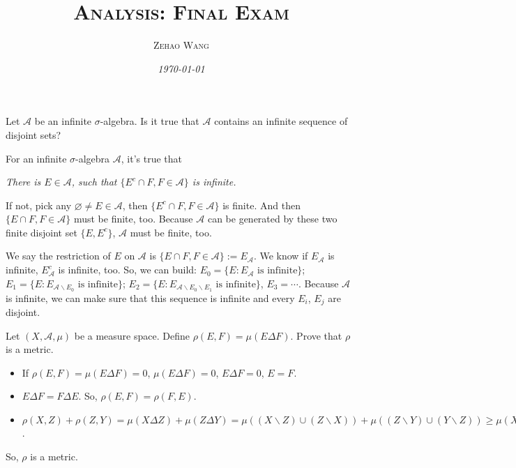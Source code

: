 \documentclass[11pt]{article}
\title{\textsc{Analysis: Final Exam}}
\author{\textsc{Zehao Wang}}
\date{\emph{\today}}
\numberwithin{equation}{section}
\newcounter{exercise}[section]
\newenvironment{exercise}[1][\textsc{Exercise }\thesection.\refstepcounter{exercise}\theexercise]{\begin{tcolorbox}[colback=black!15, colframe=black!80, breakable, title=\textsc{Exercise }#1]}{\end{tcolorbox}}
\newenvironment{proof}{\begin{tcolorbox}[colback=white, colframe=black!50, breakable, title=Proof. ]\setlength{\parskip}{0.8em}}{\end{tcolorbox}}
\newenvironment{solution}{\begin{tcolorbox}[colback=white, colframe=black!50, breakable, title=Solution. ]\setlength{\parskip}{0.8em}}{\end{tcolorbox}}
\begin{document}
    \maketitle

        \begin{exercise}[(1)]
            Let $\mathcal{A}$ be an infinite $\sigma$-algebra. Is it true that $\mathcal{A}$ contains an infinite sequence of disjoint sets? 
        \end{exercise}

        \begin{solution}
            For an infinite $\sigma$-algebra $\mathcal{A}$, it's true that
            \vspace{-15pt}\begin{center}
                \emph{There is $ E\in\mathcal{A}$, such that $\{ E^c\cap F,  F\in\mathcal{A}\}$ is infinite. }
            \end{center}
            \vspace{-15pt}If not, pick any $\varnothing\neq E\in\mathcal{A}$, then $\{ E^c\cap F,  F\in\mathcal{A}\}$ is finite. And then $\{ E\cap F,  F\in\mathcal{A}\}$ must be finite, too. Because $\mathcal{A}$ can be generated by these two finite disjoint set $\{ E,  E^c\}$, $\mathcal{A}$ must be finite, too. 

            We say the restriction of $ E$ on $\mathcal{A}$ is $\{E\cap F, F\in \mathcal{A}\}:=E_{\mathcal{A}}$. We know if $E_\mathcal{A}$ is infinite,  $E_\mathcal{A}^c$ is infinite, too. So, we can build: $E_0 = \{E: E_\mathcal{A}\text{ is infinite}\}$; $E_1 = \{E: E_{\mathcal{A}\backslash E_0}\text{ is infinite}\}$; $ E_2= \{E: E_{\mathcal{A}\backslash E_0\backslash E_1}\text{ is infinite}\}$, $E_3=\cdots$. Because $\mathcal{A}$ is infinite, we can make sure that this sequence is infinite and every $E_i$, $E_j$ are disjoint. 
        \end{solution}
    
        \begin{exercise}[(2)]
            Let $(X, \mathcal{A}, \mu)$ be a measure space. Define $\rho(E, F)=\mu(E \Delta F)$. Prove that $\rho$ is a metric. 
        \end{exercise}

        \begin{proof}
            \begin{itemize}
                \item If $\rho(E,F)=\mu(E\Delta F)=0$, $\mu(E\Delta F)=0$, $E\Delta F=0$, $E=F$. 
                \item $E\Delta F=F\Delta E$. So, $\rho(E,F)=\rho(F,E)$. 
                \item $\rho(X,Z)+\rho(Z,Y)=\mu(X\Delta Z)+\mu(Z\Delta Y)=\mu((X\backslash Z)\cup (Z\backslash X))+\mu((Z\backslash Y)\cup (Y\backslash Z))\geqslant\mu(X\cup Z)-\mu(X\cap Z)+\mu(Y\cup Z)-\mu(Z\cup Y)\geqslant\mu((X\backslash Y)\cup(Y\backslash X))=\rho(X,Y)$. 
            \end{itemize}
            \vspace{-15pt}So, $\rho$ is a metric. 
        \end{proof}
\end{document}
